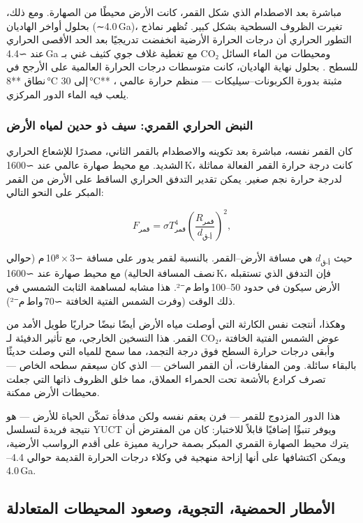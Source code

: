 \documentclass[11pt,a4paper]{article}
\begin{document}
	مباشرة بعد الاصطدام الذي شكل القمر، كانت الأرض محيطًا من الصهارة. ومع ذلك، بحلول أواخر الهاديان (∼4.0 Ga)، تغيرت الظروف السطحية بشكل كبير. 
	تُظهر نماذج التطور الحراري أن درجات الحرارة الأرضية انخفضت تدريجيًا بعد الحد الأقصى الحراري عند ∼4.4 Ga مع تغطية غلاف جوي كثيف غني بـ CO₂ ومحيطات من الماء السائل للسطح \cite{Korenaga2017}. بحلول نهاية الهاديان، كانت متوسطات درجات الحرارة العالمية على الأرجح في نطاق **8 °C إلى 30 °C** \cite{Charnay2017}، مثبتة بدورة الكربونات–سيليكات — منظم حرارة عالمي يلعب فيه الماء الدور المركزي.
	
	\subsubsection{النبض الحراري القمري: سيف ذو حدين لمياه الأرض}
	
	كان القمر نفسه، مباشرة بعد تكوينه والاصطدام بالقمر الثاني، مصدرًا للإشعاع الحراري الشديد. مع محيط صهارة عالمي عند ∼1600 K، كانت درجة حرارة القمر الفعالة مماثلة لدرجة حرارة نجم صغير. يمكن تقدير التدفق الحراري الساقط على الأرض من القمر المبكر على النحو التالي:
	
	\[
	F_{\text{قمر}} = \sigma T_{\text{قمر}}^{4} \left( \frac{R_{\text{قمر}}}{d_{\text{أ-ق}}} \right)^{2},
	\]
	
	حيث \(d_{\text{أ-ق}}\) هي مسافة الأرض–القمر. بالنسبة لقمر يدور على مسافة ∼3 × 10⁸ م (حوالي نصف المسافة الحالية) مع محيط صهارة عند ∼1600 K، فإن التدفق الذي تستقبله الأرض سيكون في حدود 50–100 واط م⁻². هذا مشابه لمساهمة الثابت الشمسي في ذلك الوقت (وفرت الشمس الفتية الخافتة ∼70 واط م⁻²).
	
	وهكذا، أنتجت نفس الكارثة التي أوصلت مياه الأرض أيضًا نبضًا حراريًا طويل الأمد من القمر. هذا التسخين الخارجي، مع تأثير الدفيئة لـ CO₂، عوض الشمس الفتية الخافتة وأبقى درجات حرارة السطح فوق درجة التجمد، مما سمح للمياه التي وصلت حديثًا بالبقاء سائلة. ومن المفارقات، أن القمر الساخن — الذي كان سيعقم سطحه الخاص — تصرف كرادع بالأشعة تحت الحمراء العملاق، مما خلق الظروف ذاتها التي جعلت محيطات الأرض ممكنة.
	
	هذا الدور المزدوج للقمر — فرن يعقم نفسه ولكن مدفأة تمكّن الحياة للأرض — هو نتيجة فريدة لتسلسل YUCT ويوفر تنبؤًا إضافيًا قابلاً للاختبار: كان من المفترض أن يترك محيط الصهارة القمري المبكر بصمة حرارية مميزة على أقدم الرواسب الأرضية، ويمكن اكتشافها على أنها إزاحة منهجية في وكلاء درجات الحرارة القديمة حوالي 4.4–4.0 Ga.
	
	\subsection{الأمطار الحمضية، التجوية، وصعود المحيطات المتعادلة}
	
\end{document}
